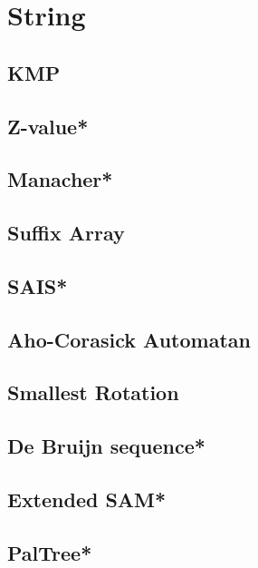 \section{String}
\subsection{KMP}

\subsection{Z-value*} %

\subsection{Manacher*} %

\subsection{Suffix Array}

\subsection{SAIS*} %

\subsection{Aho-Corasick Automatan}

\subsection{Smallest Rotation}

\subsection{De Bruijn sequence*} %

\subsection{Extended SAM*} %

\subsection{PalTree*} %



